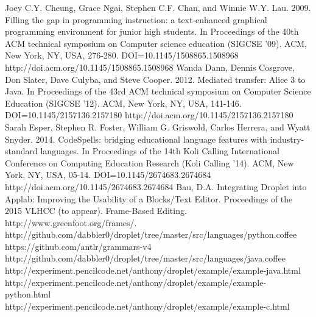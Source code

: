 \documentclass[conference]{IEEEtran}
\begin{document}
\begin{thebibliography}{1}
  Joey C.Y. Cheung, Grace Ngai, Stephen C.F. Chan, and Winnie W.Y. Lau. 2009. Filling the gap in programming instruction: a text-enhanced graphical programming environment for junior high students. In Proceedings of the 40th ACM technical symposium on Computer science education (SIGCSE '09). ACM, New York, NY, USA, 276-280. DOI=10.1145/1508865.1508968 http://doi.acm.org/10.1145/1508865.1508968
  Wanda Dann, Dennis Cosgrove, Don Slater, Dave Culyba, and Steve Cooper. 2012. Mediated transfer: Alice 3 to Java. In Proceedings of the 43rd ACM technical symposium on Computer Science Education (SIGCSE '12). ACM, New York, NY, USA, 141-146. DOI=10.1145/2157136.2157180 http://doi.acm.org/10.1145/2157136.2157180
  Sarah Esper, Stephen R. Foster, William G. Griswold, Carlos Herrera, and Wyatt Snyder. 2014. CodeSpells: bridging educational language features with industry-standard languages. In Proceedings of the 14th Koli Calling International Conference on Computing Education Research (Koli Calling '14). ACM, New York, NY, USA, 05-14. DOI=10.1145/2674683.2674684 http://doi.acm.org/10.1145/2674683.2674684
  Bau, D.A. Integrating Droplet into Applab: Improving the Usability of a Blocks/Text Editor. Proceedings of the 2015 VLHCC (to appear).
  Frame-Based Editing. http://www.greenfoot.org/frames/.
  http://github.com/dabbler0/droplet/tree/master/src/languages/python.coffee
  https://github.com/antlr/grammars-v4
  http://github.com/dabbler0/droplet/tree/master/src/languages/java.coffee
  http://experiment.pencilcode.net/anthony/droplet/example/example-java.html
  http://experiment.pencilcode.net/anthony/droplet/example/example-python.html
  http://experiment.pencilcode.net/anthony/droplet/example/example-c.html

\end{thebibliography}

\end{document}

